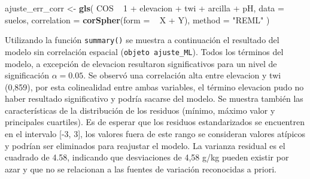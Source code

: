 \documentclass[11pt,b5paper,]{krantz}
\newenvironment{Shaded}{}{}
\newcommand{\DataTypeTok}[1]{\textcolor[rgb]{0.56,0.13,0.00}{#1}}
\newcommand{\DecValTok}[1]{\textcolor[rgb]{0.25,0.63,0.44}{#1}}
\newcommand{\KeywordTok}[1]{\textcolor[rgb]{0.00,0.44,0.13}{\textbf{#1}}}
\newcommand{\NormalTok}[1]{#1}
\newcommand{\OperatorTok}[1]{\textcolor[rgb]{0.40,0.40,0.40}{#1}}
\newcommand{\StringTok}[1]{\textcolor[rgb]{0.25,0.44,0.63}{#1}}
\begin{document}
\begin{Shaded}
\begin{Highlighting}[]
\NormalTok{ajuste_err_corr <-}\StringTok{ }\KeywordTok{gls}\NormalTok{(}
\NormalTok{  COS }\OperatorTok{~}\StringTok{ }\DecValTok{1} \OperatorTok{+}\StringTok{ }\NormalTok{elevacion }\OperatorTok{+}\StringTok{ }\NormalTok{twi }\OperatorTok{+}\StringTok{ }\NormalTok{arcilla }\OperatorTok{+}\StringTok{ }\NormalTok{pH,}
  \DataTypeTok{data =}\NormalTok{ suelos,}
  \DataTypeTok{correlation =} \KeywordTok{corSpher}\NormalTok{(}\DataTypeTok{form =}  \OperatorTok{~}\StringTok{ }\NormalTok{X }\OperatorTok{+}\StringTok{ }\NormalTok{Y),}
  \DataTypeTok{method =} \StringTok{"REML"}
\NormalTok{)}
\end{Highlighting}
\end{Shaded}

Utilizando la función \texttt{summary()} se muestra a continuación el resultado del modelo sin correlación espacial (\texttt{objeto\ ajuste\_ML}). Todos los términos del modelo, a excepción de elevacion resultaron significativos para un nivel de significación \(\alpha=0.05\). Se observó una correlación alta entre elevacion y twi (0,859), por esta colinealidad entre ambas variables, el término elevacion pudo no haber resultado significativo y podría sacarse del modelo. Se muestra también las características de la distribución de los residuos (mínimo, máximo valor y principales cuartiles). Es de esperar que los residuos estandarizados se encuentren en el intervalo {[}-3, 3{]}, los valores fuera de este rango se consideran valores atípicos y podrían ser eliminados para reajustar el modelo. La varianza residual es el cuadrado de 4.58, indicando que desviaciones de 4,58 g/kg pueden existir por azar y que no se relacionan a las fuentes de variación reconocidas a priori.
\end{document}
